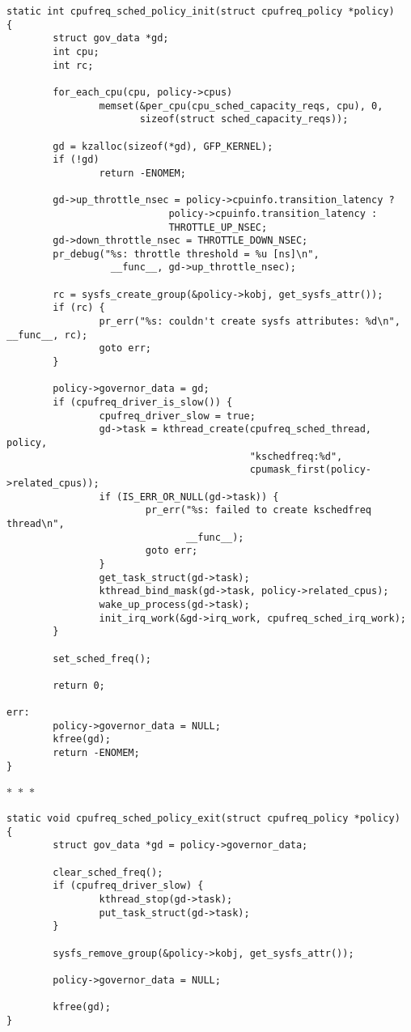 \documentclass{article}
\newcommand{\divider}{{\begin{center}
  $\ast$~$\ast$~$\ast$
\end{center}}}
\begin{document}
\begin{verbatim}
static int cpufreq_sched_policy_init(struct cpufreq_policy *policy)
{
        struct gov_data *gd;
        int cpu;
        int rc;

        for_each_cpu(cpu, policy->cpus)
                memset(&per_cpu(cpu_sched_capacity_reqs, cpu), 0,
                       sizeof(struct sched_capacity_reqs));

        gd = kzalloc(sizeof(*gd), GFP_KERNEL);
        if (!gd)
                return -ENOMEM;

        gd->up_throttle_nsec = policy->cpuinfo.transition_latency ?
                            policy->cpuinfo.transition_latency :
                            THROTTLE_UP_NSEC;
        gd->down_throttle_nsec = THROTTLE_DOWN_NSEC;
        pr_debug("%s: throttle threshold = %u [ns]\n",
                  __func__, gd->up_throttle_nsec);

        rc = sysfs_create_group(&policy->kobj, get_sysfs_attr());
        if (rc) {
                pr_err("%s: couldn't create sysfs attributes: %d\n", __func__, rc);
                goto err;
        }

        policy->governor_data = gd;
        if (cpufreq_driver_is_slow()) {
                cpufreq_driver_slow = true;
                gd->task = kthread_create(cpufreq_sched_thread, policy,
                                          "kschedfreq:%d",
                                          cpumask_first(policy->related_cpus));
                if (IS_ERR_OR_NULL(gd->task)) {
                        pr_err("%s: failed to create kschedfreq thread\n",
                               __func__);
                        goto err;
                }
                get_task_struct(gd->task);
                kthread_bind_mask(gd->task, policy->related_cpus);
                wake_up_process(gd->task);
                init_irq_work(&gd->irq_work, cpufreq_sched_irq_work);
        }

        set_sched_freq();

        return 0;

err:
        policy->governor_data = NULL;
        kfree(gd);
        return -ENOMEM;
}
\end{verbatim}
\divider
\begin{verbatim}
static void cpufreq_sched_policy_exit(struct cpufreq_policy *policy)
{
        struct gov_data *gd = policy->governor_data;

        clear_sched_freq();
        if (cpufreq_driver_slow) {
                kthread_stop(gd->task);
                put_task_struct(gd->task);
        }

        sysfs_remove_group(&policy->kobj, get_sysfs_attr());

        policy->governor_data = NULL;

        kfree(gd);
}
\end{verbatim}
\end{document}
